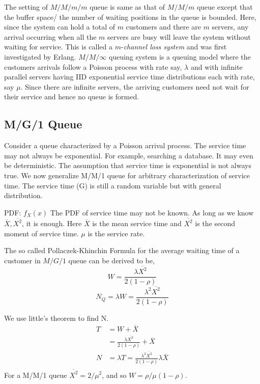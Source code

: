 The setting of $M/M/m/m$ queue is same as that of $M/M/m$ queue except that the buffer space/ the number of waiting positions in the queue is bounded. Here, since the system can hold a total of $m$ customers and there are $m$ servers, any arrival occurring when all the $m$ servers are busy will leave the system without waiting for service. This is called a $m$-\textit{channel loss system} and was first investigated by Erlang. $M/M/\infty$ queuing system is a queuing model where the customers arrivals follow a Poisson process with rate say, $\lambda$ and with infinite parallel servers having IID exponential service time distributions each with rate, say $\mu$. Since there are infinite servers, the arriving customers need not wait for their service and hence no queue is formed.
\subsection{M/G/1 Queue}
Consider a queue characterized by a Poisson arrival process. The service time may not always be exponential. For example, searching a database. It may even be deterministic. The assumption that service time is exponential is not always true. We now generalize M/M/1 queue for arbitrary characterization of service time. The service time (G) is still a random variable but with general distribution. 

PDF: $f_{X}(x)$
The PDF of service time may not be known. As long as we know $\overline{X},\overline{X^{2}}$, it is enough. Here $\overline{X}$ is the mean service time and $\overline{X^{2}}$ is the second moment of service time. $\mu$ is the service rate.

The so called Pollaczek-Khinchin Formula for the average waiting time of a customer in $M/G/1$ queue can be derived to be,
\begin{equation*}
    W = \frac{\lambda \overline{X^{2}}}{2(1-\rho)}
\end{equation*}
\begin{equation*}
    N_{Q} = \lambda W = \frac{\lambda^{2}\overline{X^{2}}}{2(1-\rho)}
\end{equation*}


We use little's theorem to find N.
\begin{equation*}
\begin{split}
        T &= W + \overline{X} \\
        &= \frac{\lambda \overline{X^{2}}}{2(1-\rho)} + \overline{X} \\
        N &= \lambda T = \frac{\lambda^{2} \overline{X^{2}}}{2(1-\rho)}\lambda\overline{X} \\
\end{split}
\end{equation*}
\newline
For a M/M/1 queue $\overline{X^{2}} = 2/\mu^{2}$, and so  $W = \rho/ \mu(1-\rho)$.

